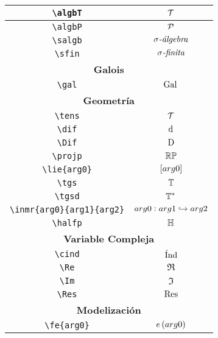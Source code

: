 \begin{longtable}{|c|c|}
\verb|\algbT| & $\displaystyle\mathcal{T}$ \\ \hline 
\verb|\algbP| & $\displaystyle\mathcal{P}$ \\ \hline 
\verb|\salgb| & $\displaystyle\sigma \textit{-\'{a}lgebra}$ \\ \hline 
\verb|\sfin| & $\displaystyle\sigma \textit{-finita}$ \\ \hline 
\multicolumn{2}{|c|}{\textbf{Galois}} \\ \hline 
\verb|\gal| & $\displaystyle\mathrm{Gal}\,$ \\ \hline 
\multicolumn{2}{|c|}{\textbf{Geometría}} \\ \hline 
\verb|\tens| & $\displaystyle\mathcal{T}$ \\ \hline 
\verb|\dif| & $\displaystyle\operatorname{d\!}{}$ \\ \hline 
\verb|\Dif| & $\displaystyle\operatorname{D\!}{}$ \\ \hline 
\verb|\projp| & $\displaystyle\mathbb{RP}$ \\ \hline 
\verb|\lie{arg0}| & $\displaystyle\left[arg0\right]$ \\ \hline 
\verb|\tgs| & $\displaystyle\mathbb{T}$ \\ \hline 
\verb|\tgsd| & $\displaystyle\mathbb{T}^*$ \\ \hline 
\verb|\inmr{arg0}{arg1}{arg2}| & $\displaystyle arg0 : arg1 \hookrightarrow arg2$ \\ \hline 
\verb|\halfp| & $\displaystyle\mathbb{H}$ \\ \hline 
\multicolumn{2}{|c|}{\textbf{Variable Compleja}} \\ \hline 
\verb|\cind| & $\displaystyle\operatorname{\acute{I}nd}$ \\ \hline 
\verb|\Re| & $\displaystyle\Re$ \\ \hline 
\verb|\Im| & $\displaystyle\Im$ \\ \hline 
\verb|\Res| & $\displaystyle\operatorname{Res}$ \\ \hline 
\multicolumn{2}{|c|}{\textbf{Modelización}} \\ \hline 
\verb|\fe{arg0}| & $\displaystyle e\left(arg0\right)$ \\ \hline 
\end{longtable}